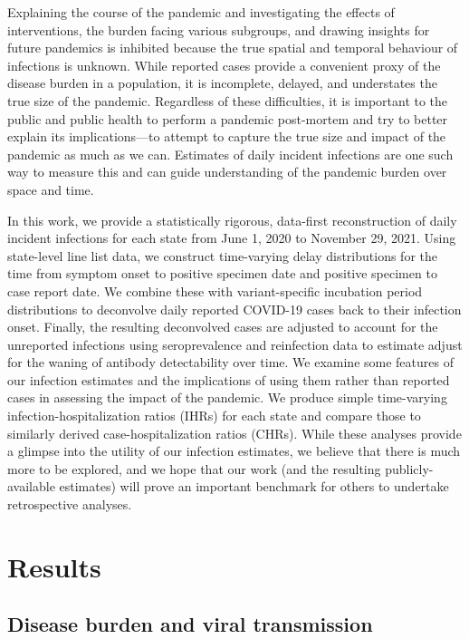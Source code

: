\documentclass{article}
\begin{document}
Explaining the course of the pandemic and investigating the effects of
interventions, the burden facing various subgroups, and drawing insights for
future pandemics is inhibited because the true spatial and temporal behaviour of
infections is unknown. While reported cases provide a convenient proxy of the
disease burden in a population, it is incomplete, delayed, and understates the
true size of the pandemic. Regardless of these difficulties, it is important to
the public and public health to perform a pandemic post-mortem and try to better
explain its implications---to attempt to capture the true size and impact of the
pandemic as much as we can. Estimates of daily incident infections are one such
way to measure this and can guide understanding of the pandemic burden over
space and time.

In this work, we provide a statistically rigorous, data-first reconstruction of
daily incident infections for each \US state from June 1, 2020 to November 29, 2021.
Using state-level line list data, we construct time-varying delay distributions
for the time from symptom onset to positive specimen date and positive specimen
to case report date. We combine these with variant-specific incubation period
distributions to deconvolve daily reported COVID-19 cases back to their
infection onset. Finally, the resulting deconvolved cases are adjusted to
account for the unreported infections using seroprevalence and reinfection data
to estimate adjust for the waning of antibody detectability over time. We
examine some features of our infection estimates and the implications of using
them rather than reported cases in assessing the impact of the pandemic. We
produce simple time-varying infection-hospitalization ratios (IHRs) for each
state and compare those to similarly derived case-hospitalization ratios (CHRs).
While these analyses provide a glimpse into the utility of our infection
estimates, we believe that there is much more to be explored, and we hope that
our work (and the resulting publicly-available estimates) will prove an
important benchmark for others to undertake retrospective analyses.




\section{Results}
\label{sec:results}

\subsection{Disease burden and viral transmission}
\end{document}
